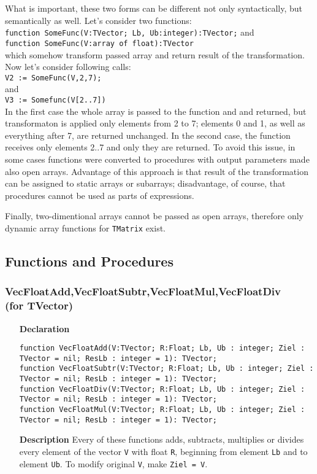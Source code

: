 \documentclass[12pt,a4paper,oneside]{report}
\newcommand{\declarationitem}[1]{\textbf{#1}}
\newcommand{\descriptiontitle}[1]{\textbf{#1}}
\newcommand{\code}[1]{\texttt{#1}}
\begin{document}
What is important, these two forms can be different not only syntactically, but semantically as well. Let's consider two functions:\\
\code{function SomeFunc(V:TVector; Lb, Ub:integer):TVector;}
and\\
\code{function SomeFunc(V:array of float):TVector}\\
which somehow transform passed array and return result of the transformation. Now let's consider following calls:\\
\code{V2 := SomeFunc(V,2,7);}\\
and\\
\code{V3 := Somefunc(V[2..7])}\\
In the first case the whole array is passed to the function and and returned, but transformaton is applied only elements from 2 to 7; elements 0 and 1, as well as everything after 7, are returned unchanged. In the second case, the function receives only elements 2..7 and only they are returned. To avoid this issue, in some cases functions were converted to procedures with output parameters made also open arrays. Advantage of this approach is that result of the transformation can be assigned to static arrays or subarrays; disadvantage, of course, that procedures cannot be used as parts of expressions.

Finally, two-dimentional arrays cannot be passed as open arrays, therefore only dynamic array functions for \code{TMatrix} exist.
  
\subsection{Functions and Procedures}
\subsubsection{VecFloatAdd,VecFloatSubtr,VecFloatMul,VecFloatDiv\\
(for TVector)}
\label{VecFloatAdd}
\begin{itemize}
	\item[\declarationitem{Declaration}\hfill]
	\begin{flushleft}
	\code{function VecFloatAdd(V:TVector; R:Float; Lb, Ub : integer; 
		Ziel : TVector = nil; ResLb : integer = 1): TVector;\\
	function VecFloatSubtr(V:TVector; R:Float; Lb, Ub : integer; 
	Ziel : TVector = nil; ResLb : integer = 1): TVector;\\
	function VecFloatDiv(V:TVector; R:Float; Lb, Ub : integer; 
	Ziel : TVector = nil; ResLb : integer = 1): TVector;\\
	function VecFloatMul(V:TVector; R:Float; Lb, Ub : integer;  
	Ziel : TVector = nil; ResLb : integer = 1): TVector;}
	\end{flushleft}
	\item[\descriptiontitle{Description}]
	Every of these functions adds, subtracts, multiplies or divides every element of the vector \code{V} with float \code{R}, beginning from element \code{Lb} and to element \code{Ub}. To modify original \code{V}, make \code{Ziel = V}. 
\end{itemize} 
\end{document}
